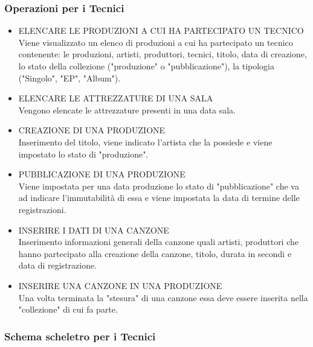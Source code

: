 \documentclass{article}
\newcounter{counteroperazioni}
\newcommand{\coperazioni}{\addtocounter{counteroperazioni}{1}\thecounteroperazioni}
\begin{document}
\subsubsection{Operazioni per i Tecnici}
\begin{itemize}[labelindent=1.5em,labelsep=.5cm,leftmargin=*]
    \item [\textbf{T\coperazioni)}] ELENCARE LE PRODUZIONI A CUI HA PARTECIPATO UN TECNICO \\ Viene visualizzato un elenco di produzioni a cui ha partecipato un tecnico contenente: le produzioni, artisti, produttori, tecnici, titolo, data di creazione, lo stato della collezione ("produzione" o "pubblicazione"), la tipologia ("Singolo", "EP", "Album").
    \item [\textbf{T\coperazioni)}] ELENCARE LE ATTREZZATURE DI UNA SALA \\ Vengono elencate le attrezzature presenti in una data sala.
    \item [\textbf{T\coperazioni)}] CREAZIONE DI UNA PRODUZIONE \\ Inserimento del titolo, viene indicato l'artista che la possiede e viene impostato lo stato di "produzione".
    \item [\textbf{T\coperazioni)}] PUBBLICAZIONE DI UNA PRODUZIONE \\ Viene impostata per una data produzione lo stato di "pubblicazione" che va ad indicare l'immutabilità di essa e viene impostata la data di termine delle registrazioni. 
    \item [\textbf{T\coperazioni)}] INSERIRE I DATI DI UNA CANZONE\\ Inserimento informazioni generali della canzone quali artisti, produttori che hanno partecipato alla creazione della canzone, titolo, durata in secondi e data di registrazione.
    \item [\textbf{T\coperazioni)}] INSERIRE UNA CANZONE IN UNA PRODUZIONE \\ Una volta terminata la "stesura" di una canzone essa deve essere inserita nella "collezione" di cui fa parte.
\end{itemize}

\subsubsection{Schema scheletro per i Tecnici}
\begin{center}
    
\end{center}
\end{document}
